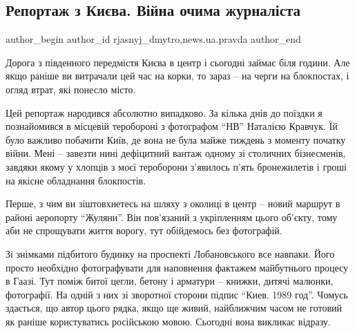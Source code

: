  
 
 
 
 
 
\subsection{Репортаж з Києва. Війна очима журналіста}
\label{sec:04_03_2022.stz.news.ua.pravda.1.reportazh_z_kieva}
 
\ifcmt
 author_begin
   author_id rjasnyj_dmytro,news.ua.pravda
 author_end
\fi

\begin{zznagolos}
Дорога з південного передмістя Києва в центр і сьогодні займає біля години. Але
якщо раніше ви витрачали цей час на корки, то зараз – на черги на блокпостах, і
огляд втрат, які понесло місто.

Цей репортаж народився абсолютно випадково. За кілька днів до поїздки я
познайомився в місцевій теробороні з фотографом \enquote{НВ} Наталією Кравчук. Їй було
важливо побачити Київ, де вона не була майже тиждень з моменту початку війни.
Мені – завезти нині дефіцитний вантаж одному зі столичних бізнесменів, завдяки
якому у хлопців з моєї тероборони з’явилось п’ять бронежилетів і гроші на
якісне обладнання блокпостів. 

Перше, з чим ви зіштовхнетесь на шляху з околиці в центр – новий маршрут в
районі аеропорту \enquote{Жуляни}. Він пов'язаний з укріпленням цього об’єкту, тому аби
не спрощувати життя ворогу, тут обійдемось без фотографій. 	
\end{zznagolos}


Зі знімками підбитого будинку на проспекті Лобановського все навпаки. Його
просто необхідно фотографувати для наповнення фактажем майбутнього процесу в
Гаазі. Тут поміж битої цегли, бетону і арматури – книжки, дитячі малюнки,
фотографії. На одній з них зі зворотної сторони підпис \enquote{Киев. 1989 год}. Чомусь
здається, що автор цього рядка, якщо ще живий, найближчим часом не готовий як
раніше користуватись російською мовою. Сьогодні вона викликає відразу.
